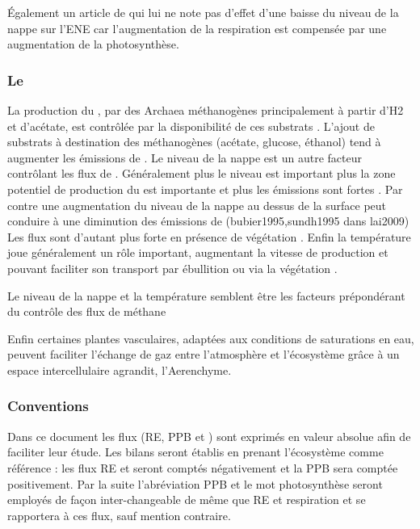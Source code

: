 Également un article de \citet{ballantyne2014} qui lui ne note pas d'effet d'une baisse du niveau de la nappe sur l'ENE car l'augmentation de la respiration est compensée par une augmentation de la photosynthèse.


\subsubsection{Le \chh}

La production du \chh, par des Archaea méthanogènes principalement à partir d'H2 et d'acétate, est contrôlée par la disponibilité de ces substrats \citep{segers1998}.
L'ajout de substrats à destination des méthanogènes (acétate, glucose, éthanol) tend à augmenter les émissions de \chh \cite{coles2002}.
Le niveau de la nappe est un autre facteur contrôlant les flux de \chh.
Généralement plus le niveau est important plus la zone potentiel de production du \chh est importante et plus les émissions sont fortes \citep{pelletier2007}.
Par contre une augmentation du niveau de la nappe au dessus de la surface peut conduire à une diminution des émissions de \chh (bubier1995,sundh1995 dans lai2009)
Les flux sont d'autant plus forte en présence de végétation \citep{pelletier2007}. 
Enfin la température joue généralement un rôle important, augmentant la vitesse de production et pouvant faciliter son transport par ébullition ou via la végétation \citep{lai2009}.


Le niveau de la nappe et la température semblent être les facteurs prépondérant du contrôle des flux de méthane

Enfin certaines plantes vasculaires, adaptées aux conditions de saturations en eau, peuvent faciliter l'échange de gaz entre l'atmosphère et l'écosystème grâce à un espace intercellulaire agrandit, l'Aerenchyme.

\subsubsection{Conventions}

Dans ce document les flux (RE, PPB et \fchh) sont exprimés en valeur absolue afin de faciliter leur étude.
Les bilans seront établis en prenant l'écosystème comme référence : les flux RE et \fchh seront comptés négativement et la PPB sera comptée positivement.
Par la suite l'abréviation PPB et le mot photosynthèse seront employés de façon inter-changeable de même que RE et respiration et se rapportera à ces flux, sauf mention contraire.


